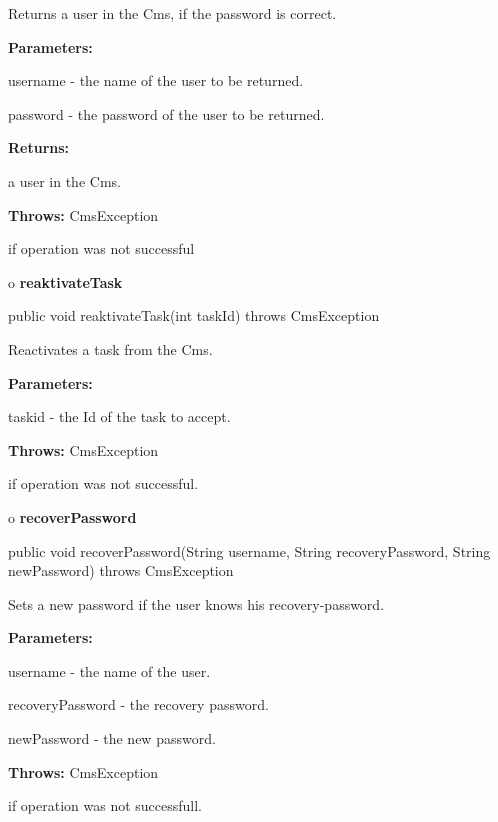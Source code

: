 \begin{description}
\htmlDD Returns a user in the Cms, if the password is correct. 

\begin{description}
\item {\bf Parameters:}  

username - the name of the user to be returned.  

password - the password of the user to be returned.  
\item {\bf Returns:}  

a user in the Cms.  
\item {\bf Throws:} CmsException  

if operation was not successful  
\end{description}

\end{description}

o {\bf reaktivateTask} 

\begin{PRE}
 public void reaktivateTask(int taskId) throws CmsException
\end{PRE}

\begin{description}
\htmlDD Reactivates a task from the Cms. 

\begin{description}
\item {\bf Parameters:}  

taskid - the Id of the task to accept.  
\item {\bf Throws:} CmsException  

if operation was not successful.  
\end{description}

\end{description}

o {\bf recoverPassword} 

\begin{PRE}
 public void recoverPassword(String username,
                             String recoveryPassword,
                             String newPassword) throws CmsException
\end{PRE}

\begin{description}
\htmlDD Sets a new password if the user knows his recovery-password. 

\begin{description}
\item {\bf Parameters:}  

username - the name of the user.  

recoveryPassword - the recovery password.  

newPassword - the new password.  
\item {\bf Throws:} CmsException  

if operation was not successfull.  
\end{description}

\end{description}

